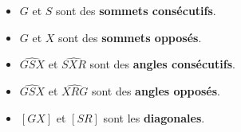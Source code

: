 \begin{changemargin}{0mm}{-15mm}
\begin{definition}[Vocabulaire]
\begin{itemize}
            \item $G$ et $S$ sont des \colorbox{red!30}{\textbf{sommets consécutifs}}.
            \item $G$ et $X$ sont des \colorbox{red!30}{\textbf{sommets opposés}}.
            \item $\widehat{GSX}$ et $\widehat{SXR}$ sont des \colorbox{red!30}{\textbf{angles consécutifs}}.
            \item $\widehat{GSX}$ et $\widehat{XRG}$ sont des \colorbox{red!30}{\textbf{angles opposés}}.
            \item $[GX]$ et $[SR]$ sont les \colorbox{red!30}{\textbf{diagonales}}.
        \end{itemize}
    \end{definition}
\end{changemargin}
 

